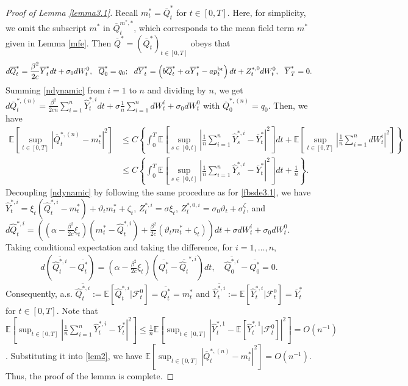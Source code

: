 \documentclass[11pt]{article}
\numberwithin{equation}{section}
\begin{document}
{\begin{proof}[Proof of Lemma \ref{lemma3.1}]
Recall $m_t^*=\overline{Q}_t^*$ for $t\in[0,T]$. Here, for simplicity, we omit the subscript $m^*$ in $\overline{Q}_t^{m^*,*}$, which corresponds to the mean field term $m^*$ given in Lemma \ref{mfe}. Then $\overline{Q}^*=(\overline{Q}_t^*)_{t\in[0,T]}$ obeys that \begin{align}\label{ccfbsde}
d\overline{Q}_t^{*}=\frac{\beta^2}{2c}\overline{Y}_t^{*}dt+\sigma_0 dW_t^0,~~\overline{Q}_0^{*}=q_0;~~d\overline{Y}_t^{*}=\left(b\overline{Q}_t^{*}+\alpha \overline{Y}_t^{*}- ap_t^{{\rm br}}\right)dt+Z_t^{ *,0}dW_t^0,~~\overline{Y}_T^*=0.
\end{align}
Summing \eqref{ndynamic} from $i=1$ to $n$ and dividing by $n$, we get $d\overline{Q}_t^{*, (n)}=\frac{\beta^2}{2cn}\sum_{i=1}^n\hat{Y}_t^{*, i}dt+\sigma\frac{1}{n}\sum_{i=1}^n dW_t^i+\sigma_0dW_t^0$ with $\overline{Q}_0^{*,(n)}=q_0$. Then, we have
\begin{align}\label{lem2}
\mathbb{E}\left[\sup_{t\in [0,T]}\left|\overline{Q}_t^{*,(n)}-m_t^*\right|^2\right]&\leq C \left\{\int_0^T\mathbb{E}\left[\sup_{s\in [0, t]}\left|\frac{1}{n}\sum_{i=1}^n \hat{Y}_s^{*,i}-\overline{Y}_t^*\right|^2\right]dt+\mathbb{E}\left[\sup_{t\in [0,T]}\left|\frac{1}{n}\sum_{i=1}^ndW_t^i\right|^2\right]\right\}\nonumber\\
&\leq C \left\{\int_0^T\mathbb{E}\left[\sup_{s\in [0, t]}\left|\frac{1}{n}\sum_{i=1}^n \hat{Y}_s^{*,i}-\overline{Y}_t^*\right|^2\right]dt+\frac{1}{n}\right\}.
\end{align}
Decoupling \eqref{ndynamic} by following the same procedure as for \eqref{fbsde3.1}, we have $\hat{Y}_t^{*,i}=\xi_t(\hat{Q}_t^{*,i}-m_t^*)+\vartheta_tm_t^*+\zeta_t$,  $Z_t^{*,i}=\sigma\xi_t$, $Z_t^{*,0,i}=\sigma_0\vartheta_t+\sigma_t^{\zeta}$,
and $d\hat{Q}_t^{*,i}=\left(\left(\alpha-\frac{\beta^2}{2c}\xi_t\right)\left(m_t^*-\hat{Q}_t^{*,i}\right)+\frac{\beta^2}{2c}\left(\vartheta_tm_t^*+\zeta_t\right)\right)dt+\sigma dW_t^i+\sigma_0dW_t^0$. Taking conditional expectation and taking the difference, for $i=1,\ldots,n$, 
\begin{align*}
d\left(\overline{\hat{Q}_t^{*,i}}-\overline{Q_t^*}\right)=\left(\alpha-\frac{\beta^2}{2c}\xi_t\right) \left(\overline{Q_t^*}-\overline{\hat{Q}_t}^{*,i}\right)dt,\quad \overline{\hat{Q}_0^{*,i}}-\overline{Q_0^*}=0.    
\end{align*}
Consequently, a.s. $\overline{\hat{Q}_t^{*,i}}:=\mathbb{E}[\hat{Q}_t^{*,i}|\mathcal{F}_t^0]=\overline{Q_t^*}=m_t^*$ and $\overline{\hat{Y}_t^{*,i}}:=\mathbb{E}[\hat{Y}_t^{*,i}|\mathcal{F}_t^0]=\overline{Y}_t^*$ for $t\in[0,T]$. Note that $\mathbb{E}\left[\sup_{t\in[0, T]}\left|\frac{1}{n}\sum_{i=1}^n\hat{Y}_t^{*,i}-\overline{Y}_t^*\right|^2\right]\leq \frac{1}{n}\mathbb{E}\left[\sup_{t\in[0, T]}\left|\hat{Y}_t^{*,1}-\mathbb{E}[\hat{Y}_t^{*,1}|\mathcal{F}_t^0]\right|^2\right]=O(n^{-1})$. Substituting it into \eqref{lem2}, we have $\mathbb{E}\left[\sup_{t\in [0,T]}\left|\overline{Q}_t^{*,(n)}-m_t^*\right|^2\right]=O(n^{-1})$. Thus, the proof of the lemma is complete.
\end{proof}}
    
\end{document}

